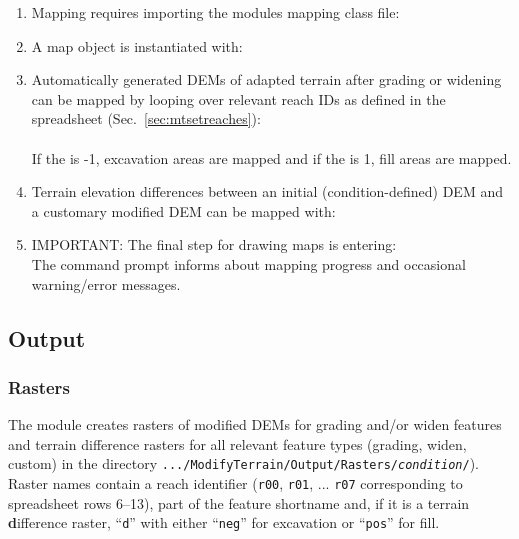 \begin{enumerate}
	\item Mapping requires importing the modules mapping class file:\\
	\item A map object is instantiated with: 
	\item Automatically generated DEMs of adapted terrain after grading or widening can be mapped by looping over relevant reach IDs as defined in the spreadsheet (Sec.~\ref{sec:mtsetreaches}):
	\\
	\\
	If the  is -1, excavation areas are mapped and if the  is 1, fill areas are mapped.\\
	\item Terrain elevation differences between an initial (condition-defined) DEM and a customary modified DEM can be mapped with:\\
	\item IMPORTANT: The final step for drawing maps is entering:
	\\
	The command prompt informs about mapping progress and occasional warning/error messages.
\end{enumerate}



\subsection{Output}
\label{sec:mtoutput}
\subsubsection{Rasters}
The module creates rasters of modified DEMs for grading and/or widen features and terrain difference rasters for all relevant feature types (grading, widen, custom) in the directory \texttt{.../ModifyTerrain/Output/Rasters/\textit{condition}/}). Raster names contain a reach identifier (\texttt{r00}, \texttt{r01}, ... \texttt{r07} corresponding to spreadsheet rows 6--13), part of the feature shortname and, if it is a terrain \textbf{d}ifference raster, ``\texttt{d}'' with either ``\texttt{neg}'' for excavation or ``\texttt{pos}'' for fill.


